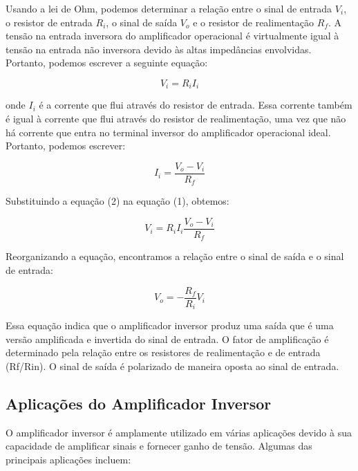 \documentclass[12pt,twoside, a4paper, twocolumn]{article}
\begin{document}
Usando a lei de Ohm, podemos determinar a relação entre o sinal de entrada $V_i$, o resistor de entrada $R_i$, o sinal de saída $V_o$ e o resistor de realimentação $R_f$. A tensão na entrada inversora do amplificador operacional é virtualmente igual à tensão na entrada não inversora devido às altas impedâncias envolvidas. Portanto, podemos escrever a seguinte equação:

\begin{equation}
    V_i = R_i I_i
\end{equation}

onde $I_i$ é a corrente que flui através do resistor de entrada. Essa corrente também é igual à corrente que flui através do resistor de realimentação, uma vez que não há corrente que entra no terminal inversor do amplificador operacional ideal. Portanto, podemos escrever:

\begin{equation}
    I_i = \frac{V_o - V_i}{R_f}
\end{equation}

Substituindo a equação (2) na equação (1), obtemos:

\begin{equation}
    V_i = R_i I_i \frac{V_o - V_i}{R_f}
\end{equation}

Reorganizando a equação, encontramos a relação entre o sinal de saída e o sinal de entrada:

\begin{equation}
    V_o = - \frac{R_f}{R_i} V_i
\end{equation}

Essa equação indica que o amplificador inversor produz uma saída que é uma versão amplificada e invertida do sinal de entrada. O fator de amplificação é determinado pela relação entre os resistores de realimentação e de entrada (Rf/Rin). O sinal de saída é polarizado de maneira oposta ao sinal de entrada.

\subsection{Aplicações do Amplificador Inversor}

O amplificador inversor é amplamente utilizado em várias aplicações devido à sua capacidade de amplificar sinais e fornecer ganho de tensão. Algumas das principais aplicações incluem:
\end{document}
